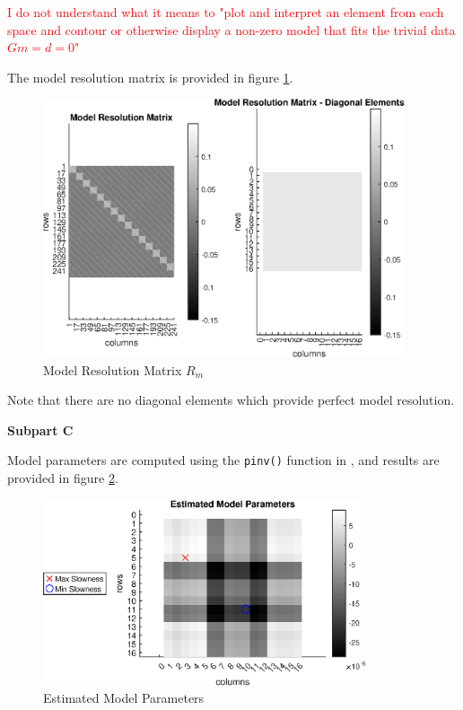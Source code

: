 \textcolor{red}{I do not understand what it means to "plot and interpret an element from each space and contour or otherwise display a non-zero model that fits the trivial data $Gm = d = 0$"}

The model resolution matrix is provided in figure \ref{fig: prob2 part A model resolution matrix}. 
 
\begin{figure}[h] 
	\centering
	\includegraphics[width=0.95\textwidth]{./images/prob2_partA_model_resolution_matrix.eps}
	\caption{Model Resolution Matrix $R_m$}
	\label{fig: prob2 part A model resolution matrix}
\end{figure}
\FloatBarrier

Note that there are no diagonal elements which provide perfect model resolution. \newline

\textbf{Subpart C} \newline

Model parameters are computed using the \verb|pinv()| function in \MATLAB, and results are provided in figure \ref{fig: prob2 part A estimated model parameters}.

\begin{figure}[h] 
	\centering
	\includegraphics[width=0.85\textwidth]{./images/prob2_partA_estimated_model_parameters.eps}
	\caption{Estimated Model Parameters}
	\label{fig: prob2 part A estimated model parameters}
\end{figure}
\FloatBarrier

